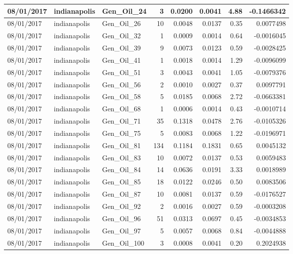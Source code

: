\documentclass[
  letterpaper,
  DIV=11,
  numbers=noendperiod]{scrartcl}
\begin{document}
\begin{tabular}{l|l|l|r|r|r|r|r}
\hline
08/01/2017 & indianapolis & Gen\_Oil\_24 & 3 & 0.0200 & 0.0041 & 4.88 & -0.1466342\\
\hline
08/01/2017 & indianapolis & Gen\_Oil\_26 & 10 & 0.0048 & 0.0137 & 0.35 & 0.0077498\\
\hline
08/01/2017 & indianapolis & Gen\_Oil\_32 & 1 & 0.0009 & 0.0014 & 0.64 & -0.0016045\\
\hline
08/01/2017 & indianapolis & Gen\_Oil\_39 & 9 & 0.0073 & 0.0123 & 0.59 & -0.0028425\\
\hline
08/01/2017 & indianapolis & Gen\_Oil\_41 & 1 & 0.0018 & 0.0014 & 1.29 & -0.0096099\\
\hline
08/01/2017 & indianapolis & Gen\_Oil\_51 & 3 & 0.0043 & 0.0041 & 1.05 & -0.0079376\\
\hline
08/01/2017 & indianapolis & Gen\_Oil\_56 & 2 & 0.0010 & 0.0027 & 0.37 & 0.0097791\\
\hline
08/01/2017 & indianapolis & Gen\_Oil\_58 & 5 & 0.0185 & 0.0068 & 2.72 & -0.0663381\\
\hline
08/01/2017 & indianapolis & Gen\_Oil\_68 & 1 & 0.0006 & 0.0014 & 0.43 & -0.0010714\\
\hline
08/01/2017 & indianapolis & Gen\_Oil\_71 & 35 & 0.1318 & 0.0478 & 2.76 & -0.0105326\\
\hline
08/01/2017 & indianapolis & Gen\_Oil\_75 & 5 & 0.0083 & 0.0068 & 1.22 & -0.0196971\\
\hline
08/01/2017 & indianapolis & Gen\_Oil\_81 & 134 & 0.1184 & 0.1831 & 0.65 & 0.0045132\\
\hline
08/01/2017 & indianapolis & Gen\_Oil\_83 & 10 & 0.0072 & 0.0137 & 0.53 & 0.0059483\\
\hline
08/01/2017 & indianapolis & Gen\_Oil\_84 & 14 & 0.0636 & 0.0191 & 3.33 & 0.0018989\\
\hline
08/01/2017 & indianapolis & Gen\_Oil\_85 & 18 & 0.0122 & 0.0246 & 0.50 & 0.0083506\\
\hline
08/01/2017 & indianapolis & Gen\_Oil\_87 & 10 & 0.0081 & 0.0137 & 0.59 & -0.0176527\\
\hline
08/01/2017 & indianapolis & Gen\_Oil\_92 & 2 & 0.0016 & 0.0027 & 0.59 & -0.0003208\\
\hline
08/01/2017 & indianapolis & Gen\_Oil\_96 & 51 & 0.0313 & 0.0697 & 0.45 & -0.0034853\\
\hline
08/01/2017 & indianapolis & Gen\_Oil\_97 & 5 & 0.0057 & 0.0068 & 0.84 & -0.0044888\\
\hline
08/01/2017 & indianapolis & Gen\_Oil\_100 & 3 & 0.0008 & 0.0041 & 0.20 & 0.2024938\\

\end{tabular}
\end{document}
